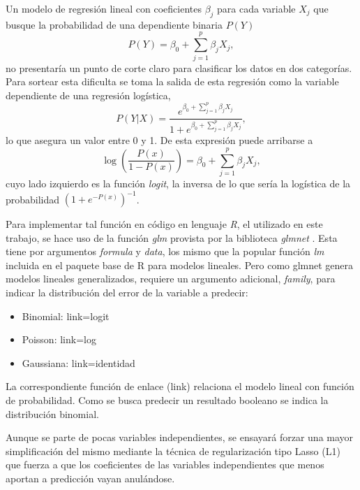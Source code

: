 \documentclass[a4paper]{report}
\begin{document}
Un modelo de regresión lineal con coeficientes \(\beta_j\) para cada variable \(X_j\) que busque la probabilidad de una dependiente binaria \(P(Y)\)  
\begin{equation}
P(Y) = \beta_0 + \sum\limits_{j=1}^p \beta_j X_j,	
\end{equation}
no presentaría un punto de corte claro para clasificar los datos en dos categorías.
Para sortear esta dificulta se toma la salida de esta regresión como la variable dependiente de una regresión logística,
\begin{equation}
P(Y|X)= \frac{e^{\beta_0 + \sum\limits_{j=1}^p \beta_j X_j}}{1+e^{\beta_0 + \sum\limits_{j=1}^p \beta_j X_j}},
\end{equation}
lo que asegura un valor entre 0 y 1.
De esta expresión puede arribarse a 
\begin{equation}
	\log \left( \frac{P(x)}{1-P(x)} \right) = \beta_0 + \sum\limits_{j=1}^p \beta_j X_j,
\end{equation}
cuyo lado izquierdo es la función \emph{logit}, la inversa de lo que sería la logística de la probabilidad \(\left(1 + e^{-{P(x)}}\right)^{-1}\).

Para implementar tal función en código en lenguaje \emph{R}, el utilizado en este trabajo, se hace uso de la función \emph{glm} provista por la biblioteca \emph{glmnet} \cite{friedman_glmnet_2023}. 
Esta tiene por argumentos \emph{formula} y \emph{data}, los mismo que la popular función \emph{lm} incluida en el paquete base de R para modelos lineales.
Pero como glmnet genera modelos lineales generalizados, requiere un argumento adicional, \emph{family}, para indicar la distribución del error de la variable a predecir:
\begin{itemize}
	\item Binomial: link=logit
	\item Poisson: link=log
	\item Gaussiana: link=identidad
\end{itemize}
La correspondiente función de enlace (link) relaciona el modelo lineal con función de probabilidad.
Como se busca predecir un resultado booleano se indica la distribución binomial.

Aunque se parte de pocas variables independientes, se ensayará forzar una mayor simplificación del mismo mediante la técnica de regularización tipo Lasso (L1) que fuerza a que los coeficientes de las variables independientes que menos aportan a predicción vayan anulándose.
\end{document}
